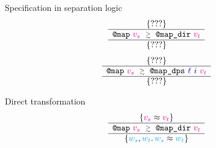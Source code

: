 \begin{frame}{Specification in separation logic}
\LARGE
\[
  \iSimvHoarePretty{
    ???
  }{
    \datalangCall{\datalangFnptr{\texttt{map}}}{\mathcolor{magenta}{\datalangVal_s}}
  }{
    \datalangCall{\datalangFnptr{\texttt{map\_dir}}}{\mathcolor{magenta}{\datalangVal_t}}
  }{
    ???
  }
\]
\vfill
\[
  \iSimvHoarePretty{
    ???
  }{
    \datalangCall{\datalangFnptr{\texttt{map}}}{\mathcolor{magenta}{\datalangVal_s}}
  }{
    \datalangCall{\datalangFnptr{\texttt{map\_dps}}}{\mathcolor{blue}{\datalangLoc}\ \datalangIdx\ \mathcolor{magenta}{\datalangVal_t}}
  }{
    ???
  }
\]
\end{frame}

\begin{frame}{Direct transformation}
\Large
\[
  \iSimvHoarePretty{
    \mathcolor{magenta}{\datalangVal_s} \iSimilar \mathcolor{magenta}{\datalangVal_t}
  }{
    \datalangCall{\datalangFnptr{\texttt{map}}}{\mathcolor{magenta}{\datalangVal_s}}
  }{
    \datalangCall{\datalangFnptr{\texttt{map\_dir}}}{\mathcolor{magenta}{\datalangVal_t}}
  }{
    \mathcolor{cyan}{\datalangValTwo_s}, \mathcolor{cyan}{\datalangValTwo_t} \ldotp
    \mathcolor{cyan}{\datalangValTwo_s} \iSimilar \mathcolor{cyan}{\datalangValTwo_t}
  }
\]
\vfill
\begin{mathpar}
\end{mathpar}
\end{frame}

